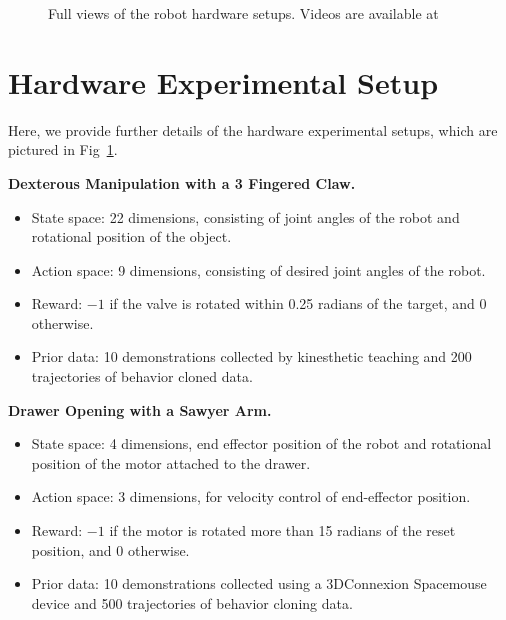 \begin{figure}[t]
\begin{subfigure}[b]{0.32\textwidth}
    \end{subfigure}
    \caption{
    Full views of the robot hardware setups. Videos are available at \projectpage
    }
    \label{fig:robot_setups}
\end{figure}

\pagebreak

\section{Hardware Experimental Setup}
\label{sec:hardwaresetup}

Here, we provide further details of the hardware experimental setups, which are pictured in Fig~\ref{fig:robot_setups}.

\noindent \textbf{Dexterous Manipulation with a 3 Fingered Claw.}
\begin{itemize}
    \item State space: 22 dimensions, consisting of joint angles of the robot and rotational position of the object. 
    \item Action space: 9 dimensions, consisting of desired joint angles of the robot.
    \item Reward: $-1$ if the valve is rotated within 0.25 radians of the target, and $0$ otherwise.
    \item Prior data: 10 demonstrations collected by kinesthetic teaching and 200 trajectories of behavior cloned data.
\end{itemize}

\noindent \textbf{Drawer Opening with a Sawyer Arm.}
\begin{itemize}
    \item State space: 4 dimensions, end effector position of the robot and rotational position of the motor attached to the drawer. 
    \item Action space: 3 dimensions, for velocity control of end-effector position.
    \item Reward: $-1$ if the motor is rotated more than 15 radians of the reset position, and $0$ otherwise.
    \item Prior data: 10 demonstrations collected using a 3DConnexion Spacemouse device and 500 trajectories of behavior cloning data.
\end{itemize}

